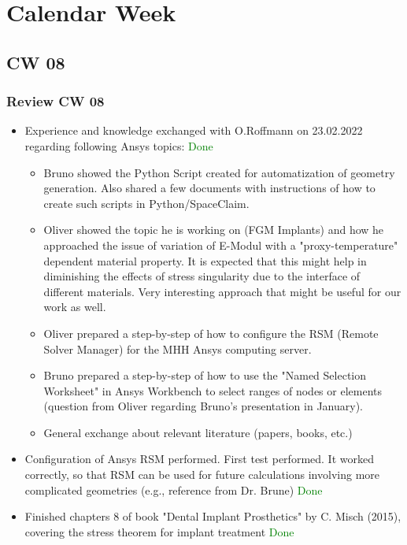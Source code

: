 \section{Calendar Week}
\subsection{CW 08}
\begin{frame}[allowframebreaks]
  \frametitle{Review CW 08}
	\begin{itemize}
		\item Experience and knowledge exchanged with O.Roffmann on 23.02.2022 regarding following Ansys topics: \textcolor{green}{Done}
		\begin{itemize}
		\item Bruno showed the Python Script created for automatization of geometry generation. Also shared a few documents with instructions of how to create such scripts in Python/SpaceClaim.
		\item Oliver showed the topic he is working on (FGM Implants) and how he approached the issue of variation of E-Modul with a "proxy-temperature" dependent material property. It is expected that this might help in diminishing the effects of stress singularity due to the interface of different materials. Very interesting approach that might be useful for our work as well.
		\item Oliver prepared a step-by-step of how to configure the RSM (Remote Solver Manager) for the MHH Ansys computing server.
		\item Bruno prepared a step-by-step of how to use the "Named Selection Worksheet" in Ansys Workbench to select ranges of nodes or elements (question from Oliver regarding Bruno's presentation in January).
		\item General exchange about relevant literature (papers, books, etc.)
		\end{itemize}
		\item Configuration of Ansys RSM performed. First test performed. It worked correctly, so that RSM can be used for future calculations involving more complicated geometries (e.g., reference from Dr. Brune) \textcolor{green}{Done}
		\item Finished chapters 8 of book "Dental Implant Prosthetics" by C. Misch (2015), covering the stress theorem for implant treatment  \textcolor{green}{Done}
	\end{itemize}
\end{frame}


